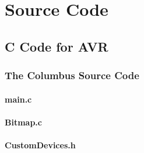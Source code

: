 \chapter{Source Code} \label{Chapter:AppendixC:Code}
\section{C Code for AVR}

\subsection{The Columbus Source Code}
\subsubsection{main.c}


\subsubsection{Bitmap.c}


\subsubsection{CustomDevices.h}


